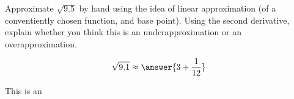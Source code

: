 \documentclass{ximera}
\author{Steven Gubkin}
\begin{document}
\begin{exercise}




Approximate $\sqrt{9.5}$ by hand using the idea of linear approximation (of a conventiently chosen function, and base point).  Using the second derivative, explain whether you think this is an underapproximation or an overapproximation.

\begin{prompt}
	$$\sqrt{9.1} \approx \answer{3+\frac{1}{12}}$$

This is an
\begin{multipleChoice}
\end{multipleChoice}
\end{prompt}

\end{exercise}
\end{document}
